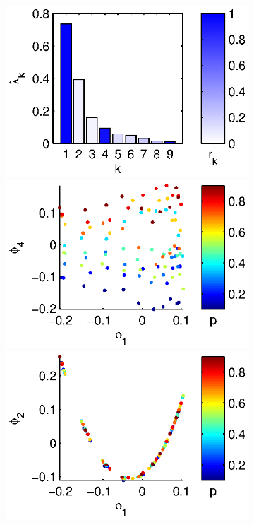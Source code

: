 \begin{figure}[t]
\begin{subfigure}[t]{1.5in}
\caption{}
\end{subfigure}
%
\begin{subfigure}[t]{2in}
\centering
\includegraphics[height=\figheight]{chemotaxis3_evals}
\includegraphics[height=\figheight]{chemotaxis3_embed_good}
\includegraphics[height=\figheight]{chemotaxis3_embed_bad}

\end{subfigure}
\end{figure}
